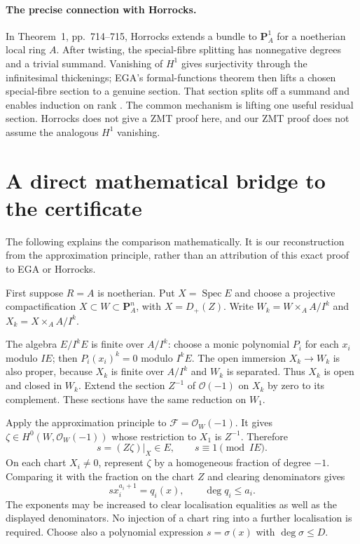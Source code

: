 \documentclass[11pt]{amsart}
\DeclareMathOperator{\Spec}{Spec}
\newcommand{\OO}{\mathcal O}
\begin{document}
\paragraph{The precise connection with Horrocks.}
In Theorem~1, pp.~714--715, Horrocks extends a bundle to $\mathbf P^1_A$
for a noetherian local ring $A$. After twisting, the special-fibre
splitting has nonnegative degrees and a trivial summand. Vanishing of
$H^1$ gives surjectivity through the infinitesimal thickenings; EGA's
formal-functions theorem then lifts a chosen special-fibre section to
a genuine section. That section splits off a summand and enables
induction on rank \cite{Horrocks}.
The common mechanism is lifting one useful residual section.
Horrocks does not give a ZMT proof here, and our ZMT proof does not
assume the analogous $H^1$ vanishing.

\section{A direct mathematical bridge to the certificate}

The following explains the comparison mathematically. It is our
reconstruction from the approximation principle, rather than an
attribution of this exact proof to EGA or Horrocks.

First suppose $R=A$ is noetherian. Put $X=\Spec E$ and choose a
projective compactification $X\subset W\subset\mathbf P^n_A$, with
$X=D_+(Z)$. Write $W_k=W\times_A A/I^k$ and
$X_k=X\times_A A/I^k$.

The algebra $E/I^kE$ is finite over $A/I^k$: choose a monic polynomial
$P_i$ for each $x_i$ modulo $IE$; then $P_i(x_i)^k=0$ modulo $I^kE$.
The open immersion $X_k\to W_k$ is also proper, because $X_k$ is
finite over $A/I^k$ and $W_k$ is separated. Thus $X_k$ is open and
closed in $W_k$. Extend the section $Z^{-1}$ of $\OO(-1)$ on $X_k$
by zero to its complement. These sections have the same reduction on
$W_1$.

Apply the approximation principle to $\mathcal F=\OO_W(-1)$.
It gives $\zeta\in H^0(W,\OO_W(-1))$ whose restriction to $X_1$ is
$Z^{-1}$. Therefore
\[
 s=(Z\zeta)|_X\in E,\qquad s\equiv1\pmod{IE}.
\]
On each chart $X_i\ne0$, represent $\zeta$ by a homogeneous fraction
of degree $-1$. Comparing it with the fraction on the chart $Z$ and
clearing denominators gives
\begin{equation}\label{DL}
 s x_i^{a_i+1}=q_i(x),\qquad \deg q_i\le a_i.
\end{equation}
The exponents may be increased to clear localisation equalities as
well as the displayed denominators. No injection of a chart ring into
a further localisation is required. Choose also a polynomial
expression $s=\sigma(x)$ with $\deg\sigma\le D$.
\end{document}
